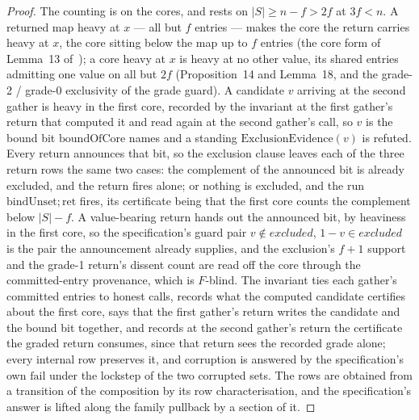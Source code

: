 \begin{proof}\leanok
  The counting is on the cores, and rests on $|S| \ge n - f > 2f$ at $3f < n$.
  A returned map heavy at $x$ --- all but $f$ entries --- makes the core the return carries heavy at $x$, the core sitting below the map up to $f$ entries (the core form of Lemma~13 of~\cite{AFW25}); a core heavy at $x$ is heavy at no other value, its shared entries admitting one value on all but $2f$ (Proposition~14 and Lemma~18, and the grade-2 / grade-0 exclusivity of the grade guard).
  A candidate $v$ arriving at the second gather is heavy in the first core, recorded by the invariant at the first gather's return that computed it and read again at the second gather's call, so $v$ is the bound bit $\mathrm{boundOfCore}$ names and a standing $\mathrm{ExclusionEvidence}(v)$ is refuted.
  Every return announces that bit, so the exclusion clause leaves each of the three return rows the same two cases: the complement of the announced bit is already excluded, and the return fires alone; or nothing is excluded, and the run $\mathrm{bindUnset}; \mathrm{ret}$ fires, its certificate being that the first core counts the complement below $|S| - f$.
  A value-bearing return hands out the announced bit, by heaviness in the first core, so the specification's guard pair $v \notin excluded$, $1-v \in excluded$ is the pair the announcement already supplies, and the exclusion's $f{+}1$ support and the grade-1 return's dissent count are read off the core through the committed-entry provenance, which is $F$-blind.
  The invariant ties each gather's committed entries to honest calls, records what the computed candidate certifies about the first core, says that the first gather's return writes the candidate and the bound bit together, and records at the second gather's return the certificate the graded return consumes, since that return sees the recorded grade alone; every internal row preserves it, and corruption is answered by the specification's own $\mathrm{fail}$ under the lockstep of the two corrupted sets.
  The rows are obtained from a transition of the composition by its row characterisation, and the specification's answer is lifted along the family pullback by a section of it.
\end{proof}
